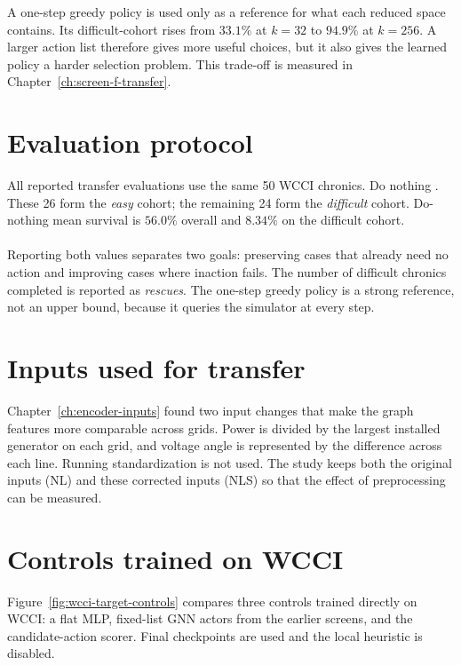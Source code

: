 \noindent A one-step greedy policy is used only as a reference for what each reduced
space contains. Its difficult-cohort  rises from $33.1\%$ at $k=32$ to
$94.9\%$ at $k=256$. A larger action list therefore gives more useful choices,
but it also gives the learned policy a harder selection problem. This trade-off
is measured in Chapter~\ref{ch:screen-f-transfer}.

\section{Evaluation protocol}
\label{sec:wcci-evaluation-protocol}

All reported transfer evaluations use the same 50 WCCI chronics. Do nothing
. These 26 form the \emph{easy} cohort; the remaining 24 form
the \emph{difficult} cohort. Do-nothing mean survival is $56.0\%$ overall and
$8.34\%$ on the difficult cohort.
\\
\\
Reporting both values separates two goals: preserving cases that already need
no action and improving cases where inaction fails. The number of difficult
chronics completed is reported as \emph{rescues}. The one-step greedy policy is
a strong reference, not an upper bound, because it queries the simulator at
every step.

\section{Inputs used for transfer}
\label{sec:wcci-corrected-inputs}

Chapter~\ref{ch:encoder-inputs} found two input changes that make the graph
features more comparable across grids. Power is divided by the largest
installed generator on each grid, and voltage angle is represented by the
difference across each line. Running standardization is not used. The study
keeps both the original inputs (NL) and these corrected inputs (NLS) so that the
effect of preprocessing can be measured.

\section{Controls trained on WCCI}
\label{sec:wcci-architecture-choice}

Figure~\ref{fig:wcci-target-controls} compares three controls trained directly
on WCCI: a flat MLP, fixed-list GNN actors from the earlier screens, and the
candidate-action scorer. Final checkpoints are used and the local heuristic is
disabled. 

